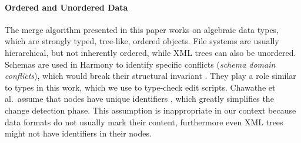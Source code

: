 \documentclass{sigplanconf}
\theoremstyle{plain}
\begin{document}
\paragraph{Ordered and Unordered Data} 
The merge algorithm presented in this paper works on algebraic data
types, which are strongly typed, tree-like, ordered objects. File
systems are usually hierarchical, but not inherently ordered, while
XML trees can also be unordered.
%
Schemas are used in Harmony to identify specific
conflicts (\emph{schema domain conflicts}), which would break their
structural invariant \cite{Pierce07}.
%
They play a role similar to types in this work, which we use to
type-check edit scripts.
%
Chawathe et al.\ assume that nodes have unique identifiers
\cite{Chawathe96}, which greatly simplifies the change detection
phase.
%
This assumption is inappropriate in our context because data formats
do not usually mark their content, furthermore even XML trees
might not have identifiers in their nodes.
	
\end{document}
